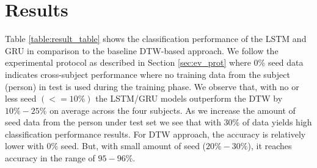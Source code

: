 \documentclass[10pt,twocolumn,letterpaper]{article}
\begin{document}
\section{Results}

Table \ref{table:result_table} shows the classification 
performance of the LSTM and GRU in comparison to the baseline DTW-based approach. We follow the experimental protocol as described in 
Section \ref{sec:ev_prot} where 0\% seed data indicates cross-subject performance where no training data from the subject (person) in test is used during the training phase. 
We observe that, with no or less seed $(<=10\%)$ the LSTM/GRU models outperform the DTW by $10\%-25\%$ on average across the four subjects. As we increase the amount of seed data from the person 
under test set we see that with 30\% of data yields high classification performance results. For DTW approach, the 
 accuracy is relatively lower with 0\% seed. But, with small amount of seed ($20\%-30\%$), it reaches accuracy in the range of $95-96\%$. 
 
 
 
\end{document}
